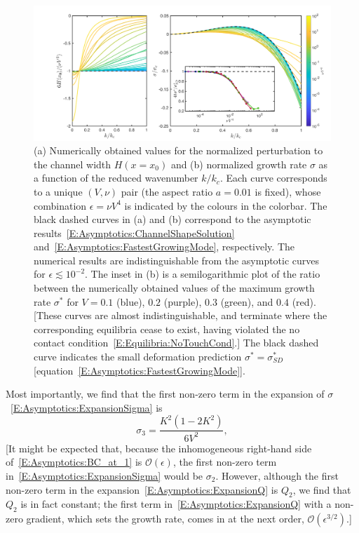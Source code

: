 \documentclass{jfm}
\newcommand{\order}[1]{\mathcal{O}\left(#1\right)}
\begin{document}
\begin{figure}
\centering
\includegraphics[width = \textwidth]{figures/fig8_asymptotics.pdf}
\caption{(a) Numerically obtained values for the normalized perturbation to the channel width $H(x = x_0)$ and (b) normalized growth rate $\sigma$ as a function of the reduced wavenumber $k/k_c$. Each curve corresponds to a unique $(V,\nu)$ pair (the aspect ratio $a = 0.01$ is fixed), whose combination $\epsilon = \nu V^4$ is indicated by the colours in the colorbar. The black dashed curves in (a) and (b) correspond to the asymptotic results~\eqref{E:Asymptotics:ChannelShapeSolution} and~\eqref{E:Asymptotics:FastestGrowingMode}, respectively. The numerical results are indistinguishable from the asymptotic curves for $\epsilon \lesssim 10^{-2}$. The inset in (b) is a semilogarithmic plot of the ratio between the numerically obtained values of the maximum growth rate $\sigma^*$ for $V = 0.1$ (blue), $0.2$ (purple), $0.3$ (green), and $0.4$ (red). [These curves are almost indistinguishable, and terminate where the corresponding equilibria cease to exist, having violated the no contact condition~\eqref{E:Equilibria:NoTouchCond}.] The black dashed curve indicates the small deformation prediction $\sigma^* = \sigma^*_{SD}$ [equation~\eqref{E:Asymptotics:FastestGrowingMode}].}
\label{fig:CollapsedGrowthRates}
\end{figure}


Most importantly, we find that the first non-zero term in the expansion of $\sigma$~\eqref{E:Asymptotics:ExpansionSigma} is
\begin{equation}\label{E:Asymptotics:LeadingOrderSigma}
\sigma_{3} = \frac{K^2\left(1-2K^2\right)}{6V^2},
\end{equation}
[It might be expected that, because the inhomogeneous right-hand side of~\eqref{E:Asymptotics:BC_at_1} is $\order{\epsilon}$, the first non-zero term in~\eqref{E:Asymptotics:ExpansionSigma} would be $\sigma_2$. However, although 
the first non-zero term in the expansion~\eqref{E:Asymptotics:ExpansionQ} is $Q_{2}$, we find that $Q_{2}$ is in fact constant; the first term in~\eqref{E:Asymptotics:ExpansionQ} with a non-zero gradient, which sets the growth rate, comes in at the next order, $\mathcal{O}(\epsilon^{3/2})$.]
\end{document}
